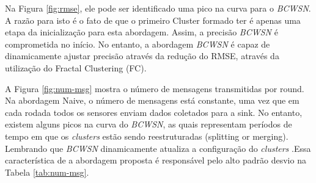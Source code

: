 \documentclass{acm_proc_article-sp}
\begin{document}
Na Figura \ref{fig:rmse}, ele pode ser identificado uma pico na curva para o
{\it BCWSN}. A razão para isto é o fato de que o primeiro Cluster formado ter
é apenas uma etapa da inicialização para esta abordagem. Assim, a precisão 
{\it BCWSN} é comprometida no início. No entanto, a abordagem {\it BCWSN} é capaz de 
dinamicamente ajustar precisão através da redução do RMSE, através da 
utilização do Fractal Clustering (FC).
\vspace*{-.3cm}

A Figura \ref{fig:num-msg} mostra o número de mensagens transmitidas por round.
Na abordagem Naive, o número de mensagens está constante, uma vez que
em cada rodada todos os sensores enviam dados coletados para a sink. 
No entanto, existem alguns picos na curva do {\it BCWSN}, as quais representam
períodos de tempo em que os {\it clusters} estão sendo reestruturadas 
(splitting or merging). {Lembrando que {\it BCWSN} dinamicamente atualiza a
configuração do {\it clusters} .}Essa característica de a abordagem proposta
é responsável pelo alto padrão desvio na Tabela \ref{tab:num-msg}.
\vspace*{-.3cm}
\end{document}
